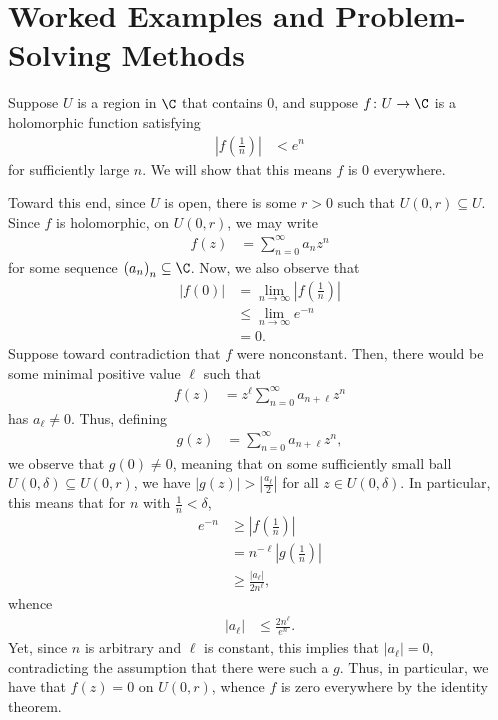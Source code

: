 \documentclass[10pt]{mypackage}
\begin{document}
\section{Worked Examples and Problem-Solving Methods}%
\begin{example}
  Suppose $U$ is a region in $\C$ that contains $0$, and suppose $f\colon U\rightarrow \C$ is a holomorphic function satisfying
  \begin{align*}
    \left\vert f\left( \frac{1}{n} \right) \right\vert &< e^{n}
  \end{align*}
  for sufficiently large $n$. We will show that this means $f$ is $0$ everywhere.%

  Toward this end, since $U$ is open, there is some $r > 0$ such that $U\left( 0,r \right)\subseteq U$. Since $f$ is holomorphic, on $U\left( 0,r \right)$, we may write
  \begin{align*}
    f\left( z \right) &= \sum_{n=0}^{\infty}a_nz^{n}
  \end{align*}
  for some sequence $\left( a_n \right)_n\subseteq \C$. Now, we also observe that
  \begin{align*}
    \left\vert f(0) \right\vert &= \lim_{n\rightarrow\infty} \left\vert f\left( \frac{1}{n} \right) \right\vert\\
                                &\leq \lim_{n\rightarrow\infty} e^{-n}\\
                                &= 0.
  \end{align*}
  Suppose toward contradiction that $f$ were nonconstant. Then, there would be some minimal positive value $\ell$ such that
  \begin{align*}
    f(z) &= z^{\ell}\sum_{n=0}^{\infty}a_{n + \ell}z^{n}
  \end{align*}
  has $a_{\ell}\neq 0$. Thus, defining
  \begin{align*}
    g(z) &= \sum_{n=0}^{\infty}a_{n + \ell}z^{n},
  \end{align*}
  we observe that $g\left( 0 \right) \neq 0$, meaning that on some sufficiently small ball $U\left( 0,\delta \right)\subseteq U\left( 0,r \right)$, we have $\left\vert g(z) \right\vert > \left\vert \frac{a_{\ell}}{2} \right\vert$ for all $z\in U\left( 0,\delta \right)$. In particular, this means that for $n$ with $\frac{1}{n} < \delta$,
  \begin{align*}
    e^{-n} &\geq \left\vert f\left( \frac{1}{n} \right) \right\vert\\
           &= n^{-\ell}\left\vert g\left( \frac{1}{n} \right) \right\vert\\
           &\geq \frac{\left\vert a_{\ell} \right\vert}{2n^{\ell}},
  \end{align*}
  whence
  \begin{align*}
    \left\vert a_{\ell} \right\vert &\leq \frac{2n^{\ell}}{e^{n}}.
  \end{align*}
  Yet, since $n$ is arbitrary and $\ell$ is constant, this implies that $\left\vert a_{\ell} \right\vert = 0$, contradicting the assumption that there were such a $g$. Thus, in particular, we have that $f(z) = 0$ on $U\left( 0,r \right)$, whence $f$ is zero everywhere by the identity theorem.
\end{example}
\end{document}
